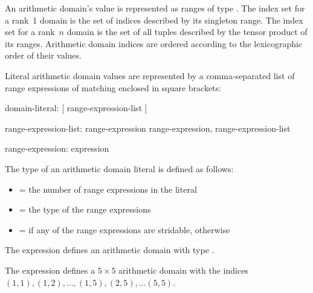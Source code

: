 An arithmetic domain's value is represented as  ranges of
 type   .  The index set for a rank~1 domain is the set of indices
 described by its singleton range.  The index set for a rank~$n$
 domain is the set of all  tuples described by the
 tensor product of its ranges.  Arithmetic domain indices are ordered
 according to the lexicographic order of their values.


Literal arithmetic domain values are represented by a comma-separated
list of range expressions of matching  enclosed in
square brackets:

%
%

\begin{syntax}
domain-literal:
  [ range-expression-list ]

range-expression-list:
  range-expression
  range-expression, range-expression-list

range-expression:
  expression
\end{syntax}

\noindent The type of an arithmetic domain literal is defined as follows:

\begin{itemize}

\item {} = the number of range expressions in the literal

\item {} = the type of the range expressions

\item {} =  if any of the range expressions
are stridable, otherwise 

\end{itemize}

\begin{example}
The expression \chpl{[1..5, 1..5]} defines an arithmetic domain with
type   .
\end{example}

\begin{example}
The expression \chpl{[1..5, 1..5]} defines a $5 \times 5$ arithmetic
domain with the indices $(1, 1), (1, 2), \ldots, (1, 5), (2, 5), \ldots (5, 5)$.
\end{example}

